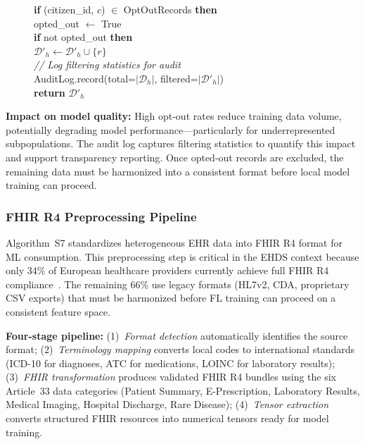 \documentclass[conference]{IEEEtran}
\begin{document}
\begin{figure}[htbp]
{{\hspace*{8mm}\textbf{if} (citizen\_id, $c$) $\in$ OptOutRecords \textbf{then}\\
\hspace*{12mm}opted\_out $\leftarrow$ True\\
\hspace*{4mm}\textbf{if} not opted\_out \textbf{then}\\
\hspace*{8mm}$\mathcal{D}'_h \leftarrow \mathcal{D}'_h \cup \{r\}$\\[2pt]
\textit{// Log filtering statistics for audit}\\
AuditLog.record(total=$|\mathcal{D}_h|$, filtered=$|\mathcal{D}'_h|$)\\
\textbf{return} $\mathcal{D}'_h$
}}
\end{figure}

\textbf{Impact on model quality:} High opt-out rates reduce training data volume, potentially degrading model performance---particularly for underrepresented subpopulations. The audit log captures filtering statistics to quantify this impact and support transparency reporting. Once opted-out records are excluded, the remaining data must be harmonized into a consistent format before local model training can proceed.

\subsubsection{FHIR R4 Preprocessing Pipeline}

Algorithm~S7 standardizes heterogeneous EHR data into FHIR R4 format for ML consumption. This preprocessing step is critical in the EHDS context because only 34\% of European healthcare providers currently achieve full FHIR R4 compliance~\cite{hussein2025interop}. The remaining 66\% use legacy formats (HL7v2, CDA, proprietary CSV exports) that must be harmonized before FL training can proceed on a consistent feature space.

\textbf{Four-stage pipeline:} (1)~\textit{Format detection} automatically identifies the source format; (2)~\textit{Terminology mapping} converts local codes to international standards (ICD-10 for diagnoses, ATC for medications, LOINC for laboratory results); (3)~\textit{FHIR transformation} produces validated FHIR R4 bundles using the six Article~33 data categories (Patient Summary, E-Prescription, Laboratory Results, Medical Imaging, Hospital Discharge, Rare Disease); (4)~\textit{Tensor extraction} converts structured FHIR resources into numerical tensors ready for model training.
\end{document}
